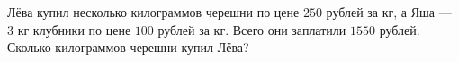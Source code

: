\begin{ex}
	\begin{condition}
		Лёва купил несколько килограммов черешни по цене \( 250 \) рублей за кг, а Яша --- \( 3 \) кг
		клубники по цене \( 100 \) рублей за кг. Всего они заплатили \( 1550 \) рублей. Сколько килограммов
		черешни купил Лёва?
	\end{condition}
\end{ex}